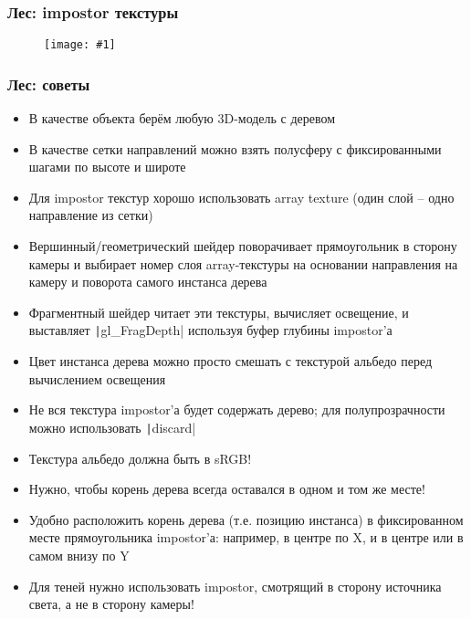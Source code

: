 \documentclass{beamer}
\newcommand{\slideimage}[1]{
  \begin{figure}
    \begin{adjustbox}{width=\textwidth, totalheight=\textheight-2\baselineskip-2\baselineskip,keepaspectratio}
      \texttt{[image: \#1]}
    \end{adjustbox}
  \end{figure}
}
\begin{document}
\begin{frame}
\frametitle{Лес: impostor текстуры}
\slideimage{impostor-textures.jpg}
\end{frame}

\begin{frame}[fragile]
\frametitle{Лес: советы}
\fontsize{8pt}{8pt}
\selectfont
\begin{itemize}
\item В качестве объекта берём любую 3D-модель с деревом
\item В качестве сетки направлений можно взять полусферу с фиксированными шагами по высоте и широте
\item Для impostor текстур хорошо использовать array texture (один слой -- одно направление из сетки)
\item Вершинный/геометрический шейдер поворачивает прямоугольник в сторону камеры и выбирает номер слоя array-текстуры на основании направления на камеру и поворота самого инстанса дерева
\item Фрагментный шейдер читает эти текстуры, вычисляет освещение, и выставляет \texttt|gl_FragDepth| используя буфер глубины impostor'а
\item Цвет инстанса дерева можно просто смешать с текстурой альбедо перед вычислением освещения 
\item Не вся текстура impostor'а будет содержать дерево; для полупрозрачности можно использовать \texttt|discard|
\item Текстура альбедо должна быть в sRGB!
\item Нужно, чтобы корень дерева всегда оставался в одном и том же месте!
\item Удобно расположить корень дерева (т.е. позицию инстанса) в фиксированном месте прямоугольника impostor'а: например, в центре по X, и в центре или в самом внизу по Y
\item Для теней нужно использовать impostor, смотрящий в сторону источника света, а не в сторону камеры!
\end{itemize}
\end{frame}
\end{document}
